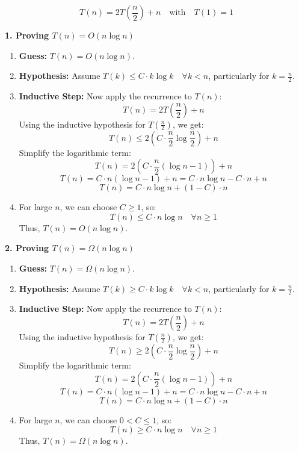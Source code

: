     \begin{example}
        \[ T(n) = 2T\left( \frac{n}{2} \right) + n \quad \text{with} \quad T(1) = 1 \]

        \textbf{1. Proving \( T(n) = O(n \log n) \)}

        \begin{enumerate}[label=\arabic*)]
            \item \textbf{Guess:} \( T(n) = O(n \log n) \).
            \item \textbf{Hypothesis:} Assume \( T(k) \leq C \cdot k \log k \quad \forall k < n \), particularly for \( k = \frac{n}{2} \).
            \item \textbf{Inductive Step:} Now apply the recurrence to \( T(n) \):
            \[
            T(n) = 2T\left(\frac{n}{2}\right) + n
            \]
            Using the inductive hypothesis for \( T\left(\frac{n}{2}\right) \), we get:
            \[
            T(n) \leq 2 \left( C \cdot \frac{n}{2} \log \frac{n}{2} \right) + n
            \]
            Simplify the logarithmic term:
            \[
            T(n) = 2 \left( C \cdot \frac{n}{2} (\log n - 1) \right) + n
            \]
            \[
            T(n) = C \cdot n (\log n - 1) + n = C \cdot n \log n - C \cdot n + n
            \]
            \[
            T(n) = C \cdot n \log n + (1 - C) \cdot n
            \]
            \item For large \( n \), we can choose \( C \geq 1 \), so:
            \[
            T(n) \leq C \cdot n \log n \quad \forall n \geq 1
            \]
            Thus, \( T(n) = O(n \log n) \).
        \end{enumerate}

        \textbf{2. Proving \( T(n) = \Omega(n \log n) \)}

        \begin{enumerate}[label=\arabic*)]
            \item \textbf{Guess:} \( T(n) = \Omega(n \log n) \).
            \item \textbf{Hypothesis:} Assume \( T(k) \geq C \cdot k \log k \quad \forall k < n \), particularly for \( k = \frac{n}{2} \).
            \item \textbf{Inductive Step:} Now apply the recurrence to \( T(n) \):
            \[
            T(n) = 2T\left(\frac{n}{2}\right) + n
            \]
            Using the inductive hypothesis for \( T\left(\frac{n}{2}\right) \), we get:
            \[
            T(n) \geq 2 \left( C \cdot \frac{n}{2} \log \frac{n}{2} \right) + n
            \]
            Simplify the logarithmic term:
            \[
            T(n) = 2 \left( C \cdot \frac{n}{2} (\log n - 1) \right) + n
            \]
            \[
            T(n) = C \cdot n (\log n - 1) + n = C \cdot n \log n - C \cdot n + n
            \]
            \[
            T(n) = C \cdot n \log n + (1 - C) \cdot n
            \]
            \item For large \( n \), we can choose \( 0 < C \leq 1 \), so:
            \[
            T(n) \geq C \cdot n \log n \quad \forall n \geq 1
            \]
            Thus, \( T(n) = \Omega(n \log n) \).
        \end{enumerate}


\end{example}
